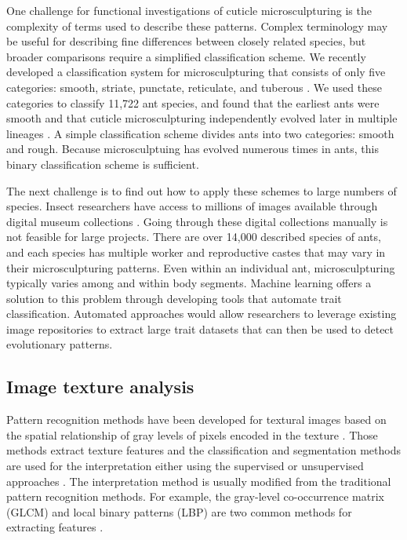 \documentclass{aci}
\numberwithin{equation}{section}
\begin{document}
One challenge for functional investigations of cuticle microsculpturing is the
complexity of terms used to describe these patterns. Complex terminology may be
useful for describing fine differences between closely related species, but
broader comparisons require a simplified classification scheme. We recently
developed a classification system for microsculpturing that consists of only
five categories: smooth, striate, punctate, reticulate, and tuberous
\cite{hellenbrand_ant_2022}. We used these categories to classify 11,722 ant
species, and found that the earliest ants were smooth and that cuticle
microsculpturing independently evolved later in multiple lineages
\cite{hellenbrand_ant_2022}. A simple classification scheme divides ants into
two categories: smooth and rough. Because microsculptuing has evolved numerous
times in ants, this binary classification scheme is sufficient.

The next challenge is to find out how to apply these schemes to large numbers of
species. Insect researchers have access to millions of images available through
digital museum collections \cite{beaman_mass_2012}. Going through these digital
collections manually is not feasible for large projects. There are over 14,000
described species of ants, and each species has multiple worker and reproductive
castes that may vary in their microsculpturing patterns. Even within an
individual ant, microsculpturing typically varies among and within body
segments. Machine learning offers a solution to this problem through developing
tools that automate trait classification. Automated approaches would allow
researchers to leverage existing image repositories to extract large trait
datasets that can then be used to detect evolutionary patterns.


\subsection{Image texture analysis}

Pattern recognition methods have been developed for textural images based on the
spatial relationship of gray levels of pixels encoded in the texture
\cite{haralick_image_1985,hung_image_2019}. Those methods extract texture
features and the classification and segmentation methods are used for the
interpretation either using the supervised or unsupervised approaches
\cite{fukunaga_introduction_2013}. The interpretation method is usually modified
from the traditional pattern recognition methods. For example, the gray-level
co-occurrence matrix (GLCM) and local binary patterns (LBP) are two common
methods for extracting features \cite{haralick_textural_1973, goos_gray_2000}.
\end{document}
